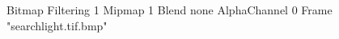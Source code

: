 {Bitmap
	{Filtering 1}
	{Mipmap 1}
	{Blend none}
	{AlphaChannel 0}
	{Frame "searchlight.tif.bmp"}
}
